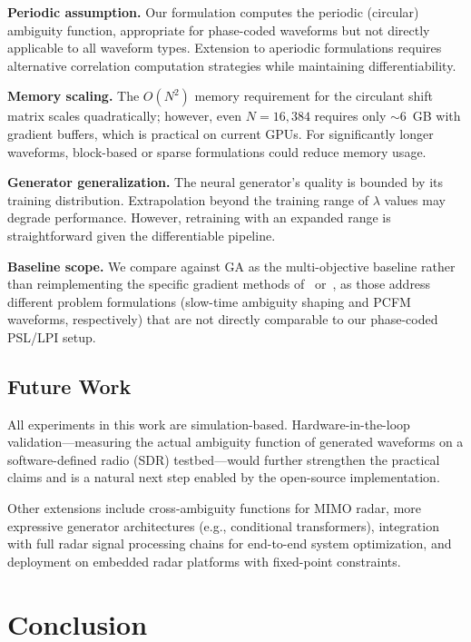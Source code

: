 \documentclass[journal]{IEEEtran}
\begin{document}
\textbf{Periodic assumption.}
Our formulation computes the periodic (circular) ambiguity function, appropriate for phase-coded waveforms but not directly applicable to all waveform types.
Extension to aperiodic formulations requires alternative correlation computation strategies while maintaining differentiability.

\textbf{Memory scaling.}
The $O(N^2)$ memory requirement for the circulant shift matrix scales quadratically; however, even $N = 16{,}384$ requires only ${\sim}6$~GB with gradient buffers, which is practical on current GPUs.
For significantly longer waveforms, block-based or sparse formulations could reduce memory usage.

\textbf{Generator generalization.}
The neural generator's quality is bounded by its training distribution.
Extrapolation beyond the training range of $\lambda$ values may degrade performance.
However, retraining with an expanded range is straightforward given the differentiable pipeline.

\textbf{Baseline scope.}
We compare against GA as the multi-objective baseline rather than reimplementing the specific gradient methods of~\cite{alhujaili2020quartic} or~\cite{mohr2021gradient}, as those address different problem formulations (slow-time ambiguity shaping and PCFM waveforms, respectively) that are not directly comparable to our phase-coded PSL/LPI setup.

\subsection{Future Work}

All experiments in this work are simulation-based.
Hardware-in-the-loop validation---measuring the actual ambiguity function of generated waveforms on a software-defined radio (SDR) testbed---would further strengthen the practical claims and is a natural next step enabled by the open-source implementation.

Other extensions include cross-ambiguity functions for MIMO radar, more expressive generator architectures (e.g., conditional transformers), integration with full radar signal processing chains for end-to-end system optimization, and deployment on embedded radar platforms with fixed-point constraints.


\section{Conclusion}
\label{sec:conclusion}
\end{document}
